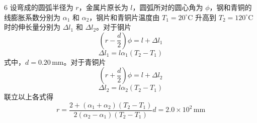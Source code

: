 \begin{solution}{6}
设弯成的圆弧半径为 $r$，金属片原长为 $l$，圆弧所对的圆心角为 $\phi$，钢和青铜的线膨胀系数分别为 $\alpha_1$ 和 $\alpha_2$，钢片和青铜片温度由 $T_1 = 20^{\circ}\mathrm{C}$ 升高到 $T_2 = 120^{\circ}\mathrm{C}$ 时的伸长量分别为 $\Delta l_1$ 和 $\Delta l_2$。对于钢片
\begin{equation}
(r - \frac{d}{2}) \phi = l + \Delta l_1
\label{eq:1.s6}
\end{equation}
\begin{equation}
\Delta l_1 = l \alpha_1 (T_2 - T_1)
\label{eq:2.s6}
\end{equation}
式中，$d = 0.20\,\mathrm{mm}$。对于青铜片
\begin{equation}
(r + \frac{d}{2}) \phi = l + \Delta l_2
\label{eq:3.s6}
\end{equation}
\begin{equation}
\Delta l_2 = l \alpha_2 (T_2 - T_1)
\label{eq:4.s6}
\end{equation}
联立以上各式得
\begin{equation}
r = \frac{2 + (\alpha_1 + \alpha_2)(T_2 - T_1)}{2(\alpha_2 - \alpha_1)(T_2 - T_1)} d = 2.0 \times 10^{2}\,\mathrm{mm}
\label{eq:5.s6}
\end{equation}
\end{solution}